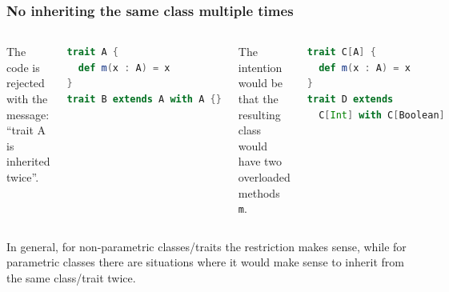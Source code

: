 \documentclass{beamer}
\begin{document}
\begin{frame}[fragile]
  \frametitle{No inheriting the same class multiple times}

  \begin{columns}[t]



    The code is rejected with the message: ``trait A is inherited twice''.

    \begin{exampleblock}{}
\begin{lstlisting}[language=scala]
trait A {
  def m(x : A) = x
}
trait B extends A with A {}
\end{lstlisting}
    \end{exampleblock}



    \pause

    The intention would be that the resulting class would have two overloaded
    methods \lstinline{m}.

    \begin{exampleblock}{}
\begin{lstlisting}[language=scala]
trait C[A] {
  def m(x : A) = x
}
trait D extends
  C[Int] with C[Boolean]
\end{lstlisting}

    \end{exampleblock}

  \end{columns}

  \vskip15pt

  \pause

  In general, for non-parametric classes/traits the restriction makes sense,
  while for parametric classes there are situations where it would make sense to
  inherit from the same class/trait twice.

\end{frame}
\end{document}
